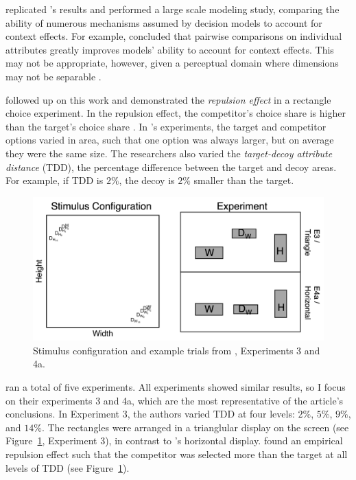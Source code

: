 \textcite{turnerCompetingTheoriesMultialternative2018a} replicated \textcite{trueblood2013not}'s results and performed a large scale modeling study, comparing the ability of numerous mechanisms assumed by decision models to account for context effects. For example, \textcite{turnerCompetingTheoriesMultialternative2018a} concluded that pairwise comparisons on individual attributes greatly improves models' ability to account for context effects. This may not be appropriate, however, given a perceptual domain where dimensions may not be separable \parencite{ashbyVarietiesPerceptualIndependence1986a}. 

\textcite{spektorWhenGoodLooks2018b} followed up on this work and demonstrated the \textit{repulsion effect} in a rectangle choice experiment. In the repulsion effect, the competitor's choice share is higher than the target's choice share \parencite{liaoInfluenceDistanceDecoy2021,evansImpactPresentationOrder2021,simonsonVicesVirtuesMisguided2014,frederickLimitsAttraction2014b,spektorRepulsionEffectPreferential2022,banerjeeFactorsThatPromote2024,bhui2021rational}. In \textcite{spektorWhenGoodLooks2018b}'s experiments, the target and competitor options varied in area, such that one option was always larger, but on average they were the same size. The researchers also varied the \textit{target-decoy attribute distance} (TDD), the percentage difference between the target and decoy areas. For example, if TDD is $2\%$, the decoy is $2\%$ smaller than the target. 

\begin{figure}
   \includegraphics[width=\linewidth]{figures/spektor_stim.png}
   \caption{Stimulus configuration and example trials from \textcite{spektorWhenGoodLooks2018b}, Experiments 3 and 4a.}
   \label{fig:spektor_stim}
\end{figure}

\textcite{spektorWhenGoodLooks2018b} ran a total of five experiments. All experiments showed similar results, so I focus on their experiments 3 and 4a, which are the most representative of the article's conclusions. In Experiment 3, the authors varied TDD at four levels: $2\%$, $5\%$, $9\%$, and $14\%$. The rectangles were arranged in a trianglular display on the screen (see Figure~\ref{fig:spektor_stim}, Experiment 3), in contrast to \textcite{trueblood2013not}'s horizontal display. \textcite{spektorWhenGoodLooks2018b} found an empirical repulsion effect such that the competitor was selected more than the target at all levels of TDD (see Figure~\ref{fig:spektor_stim}). 

